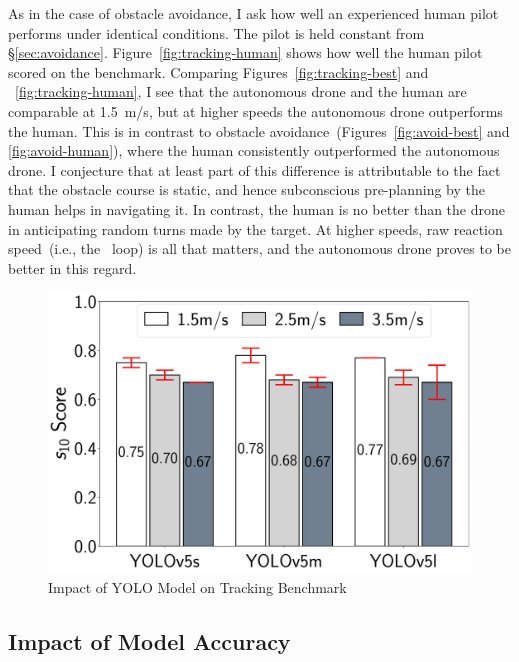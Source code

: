 As in the case of obstacle avoidance, I ask how well an experienced
human pilot performs under identical conditions. The pilot is held
constant from \S\ref{sec:avoidance}.
Figure~\ref{fig:tracking-human} shows how well the human pilot scored
on the benchmark.  Comparing Figures~\ref{fig:tracking-best} and
~\ref{fig:tracking-human}, I see that the autonomous drone and the
human are comparable at 1.5~m/s, but at higher speeds the autonomous
drone outperforms the human.  This is in contrast to obstacle
avoidance~(Figures~\ref{fig:avoid-best} and \ref{fig:avoid-human}),
where the human consistently outperformed the autonomous drone.  I
conjecture that at least part of this difference is attributable to
the fact that the obstacle course is static, and hence subconscious
pre-planning by the human helps in navigating it.  In contrast, the
human is no better than the drone in anticipating random turns made by
the target.  At higher speeds, raw reaction speed~(i.e., the
\ooda~loop) is all that matters, and the autonomous drone proves to be
better in this regard.

\begin{figure}
\centering
\includegraphics[width=0.8\linewidth]{chapter6/FIGS/fig-tracking-models.pdf}
\caption{\small Impact of YOLO Model on Tracking Benchmark}
\label{fig:track_models}
\end{figure}

\subsection{Impact of Model Accuracy}
\label{sec:tracking-models}


